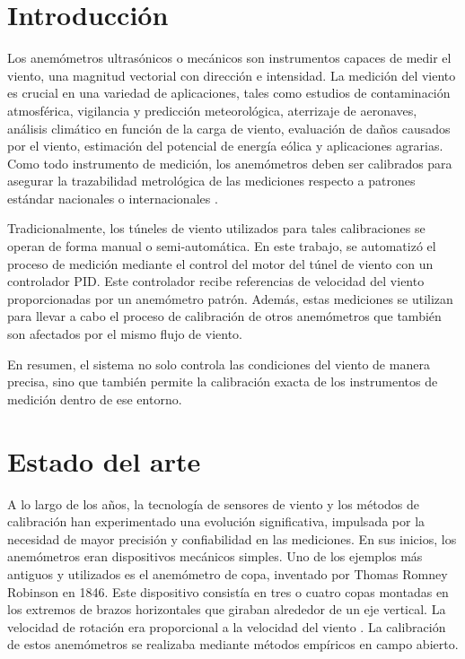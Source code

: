 \section{Introducción}

Los anemómetros ultrasónicos o mecánicos son instrumentos capaces de medir el viento, una magnitud vectorial con dirección e intensidad. La medición del viento es crucial en una variedad de aplicaciones, tales como estudios de contaminación atmosférica, vigilancia y predicción meteorológica, aterrizaje de aeronaves, análisis climático en función de la carga de viento, evaluación de daños causados por el viento, estimación del potencial de energía eólica y aplicaciones agrarias. Como todo instrumento de medición, los anemómetros deben ser calibrados para asegurar la trazabilidad metrológica de las mediciones respecto a patrones estándar nacionales o internacionales \cite{wmoChapter8}.

Tradicionalmente, los túneles de viento utilizados para tales calibraciones se operan de forma manual o semi-automática. En este trabajo, se automatizó el proceso de medición mediante el control del motor del túnel de viento con un controlador PID. Este controlador recibe referencias de velocidad del viento proporcionadas por un anemómetro patrón. Además, estas mediciones se utilizan para llevar a cabo el proceso de calibración de otros anemómetros que también son afectados por el mismo flujo de viento.

En resumen, el sistema no solo controla las condiciones del viento de manera precisa, sino que también permite la calibración exacta de los instrumentos de medición dentro de ese entorno.

\section{Estado del arte}\label{sec:estado_del_arte}
A lo largo de los años, la tecnología de sensores de viento y los métodos de calibración han experimentado una evolución significativa, impulsada por la necesidad de mayor precisión y confiabilidad en las mediciones. En sus inicios, los anemómetros eran dispositivos mecánicos simples. Uno de los ejemplos más antiguos y utilizados es el anemómetro de copa, inventado por Thomas Romney Robinson en 1846. Este dispositivo consistía en tres o cuatro copas montadas en los extremos de brazos horizontales que giraban alrededor de un eje vertical. La velocidad de rotación era proporcional a la velocidad del viento \cite{robinson1846}. La calibración de estos anemómetros se realizaba mediante métodos empíricos en campo abierto.

